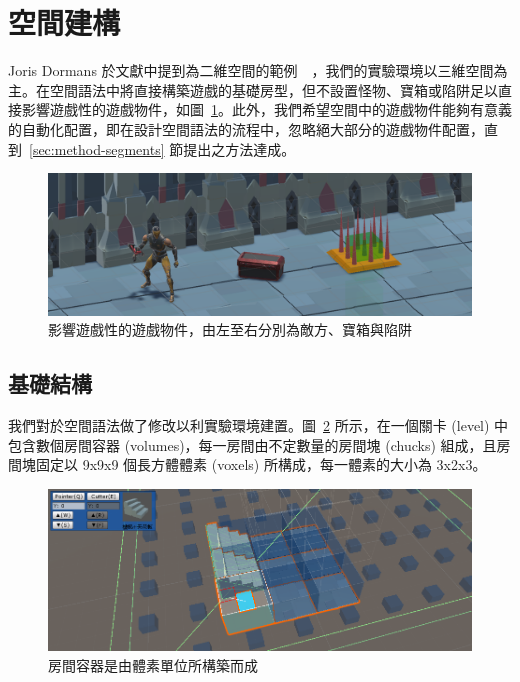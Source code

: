 \clearpage

\section{空間建構}
\label{sec:method-spacepieces}

Joris Dormans 於文獻中提到為二維空間的範例~\cite{dormans2010adventures}~\cite{dormans2012engineering}，我們的實驗環境以三維空間為主。在空間語法中將直接構築遊戲的基礎房型，但不設置怪物、寶箱或陷阱足以直接影響遊戲性的遊戲物件，如圖~\ref{fig:gameobject-list}。此外，我們希望空間中的遊戲物件能夠有意義的自動化配置，即在設計空間語法的流程中，忽略絕大部分的遊戲物件配置，直到~\ref{sec:method-segments} 節提出之方法達成。

\begin{figure}[ht]
  \begin{center}
    \includegraphics[width=1.0\textwidth]{figures/gameobject-list.png}
    \caption{影響遊戲性的遊戲物件，由左至右分別為敵方、寶箱與陷阱} 
    \label{fig:gameobject-list}
  \end{center}
\end{figure}

\subsection{基礎結構}
\label{ssec:method-spacepieces-basic}

我們對於空間語法做了修改以利實驗環境建置。圖~\ref{fig:spacepieces-structure} 所示，在一個關卡 (level) 中包含數個房間容器 (volumes)，每一房間由不定數量的房間塊 (chucks) 組成，且房間塊固定以 9x9x9 個長方體體素 (voxels) 所構成，每一體素的大小為 3x2x3。

\begin{figure}[ht]
  \begin{center}
    \includegraphics[width=1.0\textwidth]{figures/spacepieces-structure.png}
    \caption{房間容器是由體素單位所構築而成} 
    \label{fig:spacepieces-structure}
  \end{center}
\end{figure}

